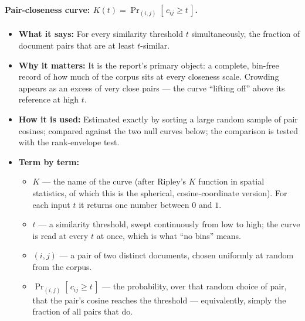 \documentclass[11pt,letterpaper]{article}
\begin{document}
\paragraph{Pair-closeness curve: $K(t) = \Pr_{(i,j)}[\, c_{ij} \ge t\,]$.}
\begin{itemize}
  \item \textbf{What it says:} For every similarity threshold $t$
  simultaneously, the fraction of document pairs that are at least
  $t$-similar.
  \item \textbf{Why it matters:} It is the report's primary object: a
  complete, bin-free record of how much of the corpus sits at every
  closeness scale. Crowding appears as an excess of very close pairs ---
  the curve ``lifting off'' above its reference at high $t$.
  \item \textbf{How it is used:} Estimated exactly by sorting a large
  random sample of pair cosines; compared against the two null curves
  below; the comparison is tested with the rank-envelope test.
  \item \textbf{Term by term:}
  \begin{itemize}
    \item $K$ --- the name of the curve (after Ripley's $K$ function in
    spatial statistics, of which this is the spherical, cosine-coordinate
    version). For each input $t$ it returns one number between $0$ and
    $1$.
    \item $t$ --- a similarity threshold, swept continuously from low to
    high; the curve is read at every $t$ at once, which is what ``no bins''
    means.
    \item $(i, j)$ --- a pair of two distinct documents, chosen uniformly
    at random from the corpus.
    \item $\Pr_{(i,j)}[\, c_{ij} \ge t\,]$ --- the probability, over that
    random choice of pair, that the pair's cosine reaches the threshold ---
    equivalently, simply the fraction of all pairs that do.
  \end{itemize}
\end{itemize}
\end{document}
